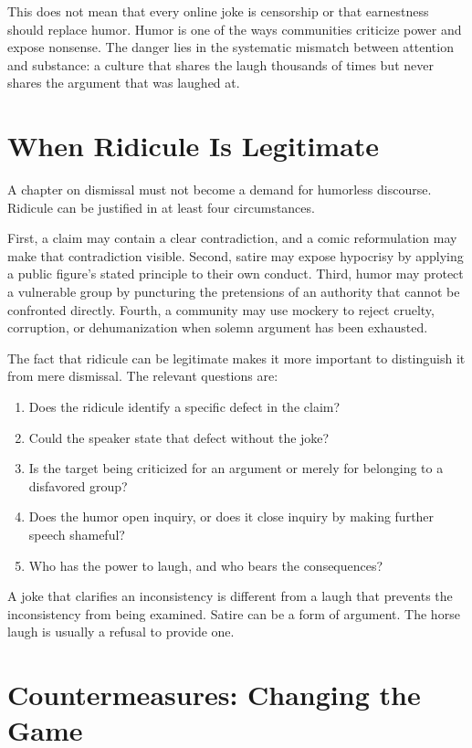 ﻿\documentclass[12pt,a4paper]{book}
\begin{document}
This does not mean that every online joke is censorship or that earnestness should replace humor. Humor is one of the ways communities criticize power and expose nonsense. The danger lies in the systematic mismatch between attention and substance: a culture that shares the laugh thousands of times but never shares the argument that was laughed at.

\section{When Ridicule Is Legitimate}

A chapter on dismissal must not become a demand for humorless discourse. Ridicule can be justified in at least four circumstances.

First, a claim may contain a clear contradiction, and a comic reformulation may make that contradiction visible. Second, satire may expose hypocrisy by applying a public figure's stated principle to their own conduct. Third, humor may protect a vulnerable group by puncturing the pretensions of an authority that cannot be confronted directly. Fourth, a community may use mockery to reject cruelty, corruption, or dehumanization when solemn argument has been exhausted.

The fact that ridicule can be legitimate makes it more important to distinguish it from mere dismissal. The relevant questions are:

\begin{enumerate}[leftmargin=*]
\item Does the ridicule identify a specific defect in the claim?
\item Could the speaker state that defect without the joke?
\item Is the target being criticized for an argument or merely for belonging to a disfavored group?
\item Does the humor open inquiry, or does it close inquiry by making further speech shameful?
\item Who has the power to laugh, and who bears the consequences?
\end{enumerate}

A joke that clarifies an inconsistency is different from a laugh that prevents the inconsistency from being examined. Satire can be a form of argument. The horse laugh is usually a refusal to provide one.

\section{Countermeasures: Changing the Game}
\end{document}
